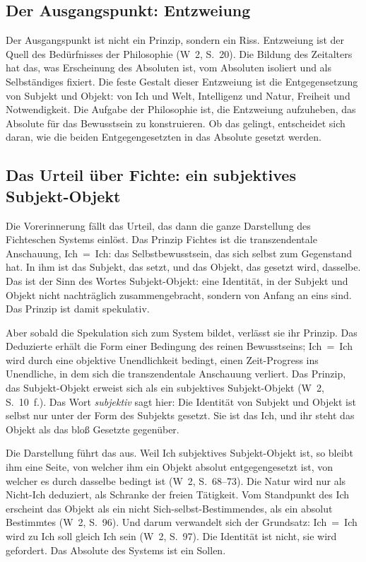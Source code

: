 \documentclass[11pt,a4paper]{article}
\newcommand{\SO}{Subjekt-Objekt}
\newcommand{\Werke}[1]{(W~2, S.~#1)}
\begin{document}
\subsection{Der Ausgangspunkt: Entzweiung}

Der Ausgangspunkt ist nicht ein Prinzip, sondern ein Riss. \glqq Entzweiung ist der Quell des Bedürfnisses der Philosophie\grqq{} \Werke{20}. Die Bildung des Zeitalters hat das, was Erscheinung des Absoluten ist, vom Absoluten isoliert und als Selbständiges fixiert. Die feste Gestalt dieser Entzweiung ist die Entgegensetzung von Subjekt und Objekt: von Ich und Welt, Intelligenz und Natur, Freiheit und Notwendigkeit. Die Aufgabe der Philosophie ist, die Entzweiung aufzuheben, das Absolute für das Bewusstsein zu konstruieren. Ob das gelingt, entscheidet sich daran, wie die beiden Entgegengesetzten in das Absolute gesetzt werden.

\subsection{Das Urteil über Fichte: ein subjektives \SO{}}

Die Vorerinnerung fällt das Urteil, das dann die ganze Darstellung des Fichteschen Systems einlöst. Das Prinzip Fichtes ist die transzendentale Anschauung, Ich~=~Ich: das Selbstbewusstsein, das sich selbst zum Gegenstand hat. In ihm ist das Subjekt, das setzt, und das Objekt, das gesetzt wird, dasselbe. Das ist der Sinn des Wortes \SO{}: eine Identität, in der Subjekt und Objekt nicht nachträglich zusammengebracht, sondern von Anfang an eins sind. Das Prinzip ist damit spekulativ.

Aber sobald die Spekulation \glqq sich zum System bildet\grqq{}, verlässt sie ihr Prinzip. Das Deduzierte erhält die Form einer Bedingung des reinen Bewusstseins; Ich~=~Ich wird durch eine objektive Unendlichkeit bedingt, einen Zeit-Progress ins Unendliche, in dem sich die transzendentale Anschauung verliert. \glqq Das Prinzip, das \SO{} erweist sich als ein subjektives \SO{}\grqq{} \Werke{10~f.}. Das Wort \emph{subjektiv} sagt hier: Die Identität von Subjekt und Objekt ist selbst nur unter der Form des Subjekts gesetzt. Sie ist das Ich, und ihr steht das Objekt als das bloß Gesetzte gegenüber.

Die Darstellung führt das aus. \glqq Weil Ich subjektives \SO{} ist, so bleibt ihm eine Seite, von welcher ihm ein Objekt absolut entgegengesetzt ist, von welcher es durch dasselbe bedingt ist\grqq{} \Werke{68--73}. Die Natur wird nur als Nicht-Ich deduziert, als Schranke der freien Tätigkeit. Vom Standpunkt des Ich erscheint das Objekt \glqq als ein nicht Sich-selbst-Bestimmendes, als ein absolut Bestimmtes\grqq{} \Werke{96}. Und darum verwandelt sich der Grundsatz: Ich~=~Ich wird zu \glqq Ich soll gleich Ich sein\grqq{} \Werke{97}. Die Identität ist nicht, sie wird gefordert. Das Absolute des Systems ist ein Sollen.
\end{document}
